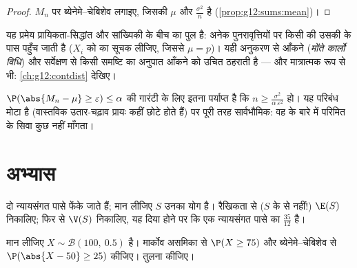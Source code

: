 \begin{proof}
$M_n$ पर ब्येनेमे--चेबिशेव लगाइए, जिसकी  $\mu$ और  $\frac{\sigma^2}{n}$ है
(\cref{prop:g12:sums:mean})।
\end{proof}

\begin{remark}
यह प्रमेय प्रायिकता-सिद्धांत और सांख्यिकी के बीच का पुल है: अनेक 
पुनरावृत्तियों पर किसी  की \emph{} उसकी \emph{}
के पास पहुँच जाती है ($X_i$ को  का सूचक लीजिए, जिससे $\mu = p$)। यही अनुकरण से
 आँकने (\emph{मोंते कार्लो विधि}) और सर्वेक्षण से किसी समष्टि का
अनुपात आँकने को उचित ठहराती है --- और मात्रात्मक रूप से भी: \cref{ch:g12:contdist} देखिए।
\end{remark}

\begin{method}[ब्येनेमे--चेबिशेव का उपयोग]\label{met:g12:sums:chebyshev}
$\P(\abs{M_n - \mu} \geq \varepsilon) \leq \alpha$ की गारंटी के लिए इतना पर्याप्त है कि $n \geq \frac{\sigma^2}{\alpha\,\varepsilon^2}$ हो। यह परिबंध मोटा है
(वास्तविक उतार-चढ़ाव प्रायः कहीं छोटे होते हैं) पर पूरी तरह सार्वभौमिक: वह
 के बारे में परिमित  के सिवा कुछ नहीं माँगता।
\end{method}

\section{अभ्यास}

\begin{exercise}[$\star$]\label{exo:g12:sums:1}
दो न्यायसंगत पासे फेंके जाते हैं; मान लीजिए $S$ उनका योग है। रैखिकता से ($S$
के  से नहीं!) $\E(S)$ निकालिए; फिर  से $\V(S)$ निकालिए, यह दिया होने
पर कि एक न्यायसंगत पासे का  $\frac{35}{12}$ है।
\end{exercise}

\begin{exercise}[$\star$]\label{exo:g12:sums:2}
मान लीजिए $X \sim \mathcal B(100,\ 0.5)$ है। मार्कोव असमिका से $\P(X \geq 75)$ और ब्येनेमे--चेबिशेव से $\P(\abs{X - 50} \geq 25)$
 कीजिए। तुलना कीजिए।
\end{exercise}

